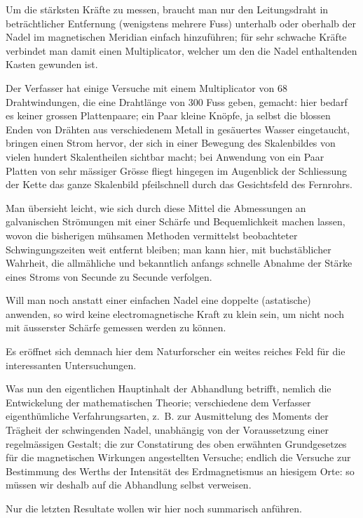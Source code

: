 \documentclass[12pt,a4paper]{article}
\begin{document}
Um die stärksten Kräfte zu messen, braucht man nur den Leitungsdraht in beträchtlicher Entfernung (wenigstens mehrere Fuss) unterhalb oder oberhalb der Nadel im magnetischen Meridian einfach hinzuführen; für sehr schwache Kräfte verbindet man damit einen Multiplicator, welcher um den die Nadel enthaltenden Kasten gewunden ist.

Der Verfasser hat einige Versuche mit einem Multiplicator von 68 Drahtwindungen, die eine Drahtlänge von 300 Fuss geben, gemacht: hier bedarf es keiner grossen Plattenpaare; ein Paar kleine Knöpfe, ja selbst die blossen Enden von Drähten aus verschiedenem Metall in gesäuertes Wasser eingetaucht, bringen einen Strom hervor, der sich in einer Bewegung des Skalenbildes von vielen hundert Skalentheilen sichtbar macht; bei Anwendung von ein Paar Platten von sehr mässiger Grösse fliegt hingegen im Augenblick der Schliessung der Kette das ganze Skalenbild pfeilschnell durch das Gesichtsfeld des Fernrohrs.

Man übersieht leicht, wie sich durch diese Mittel die Abmessungen an galvanischen Strömungen mit einer Schärfe und Bequemlichkeit machen lassen, wovon die bisherigen mühsamen Methoden vermittelst beobachteter Schwingungszeiten weit entfernt bleiben; man kann hier, mit buchstäblicher Wahrheit, die allmähliche und bekanntlich anfangs schnelle Abnahme der Stärke eines Stroms von Secunde zu Secunde verfolgen.

Will man noch anstatt einer einfachen Nadel eine doppelte (astatische) anwenden, so wird keine electromagnetische Kraft zu klein sein, um nicht noch mit äusserster Schärfe gemessen werden zu können.

Es eröffnet sich demnach hier dem Naturforscher ein weites reiches Feld für die interessanten Untersuchungen.

\bigskip

Was nun den eigentlichen Hauptinhalt der Abhandlung betrifft, nemlich die Entwickelung der mathematischen Theorie; verschiedene dem Verfasser eigenthümliche Verfahrungsarten, z.~B. zur Ausmittelung des Moments der Trägheit der schwingenden Nadel, unabhängig von der Voraussetzung einer regelmässigen Gestalt; die zur Constatirung des oben erwähnten Grundgesetzes für die magnetischen Wirkungen angestellten Versuche; endlich die Versuche zur Bestimmung des Werths der Intensität des Erdmagnetismus an hiesigem Orte: so müssen wir deshalb auf die Abhandlung selbst verweisen.

Nur die letzten Resultate wollen wir hier noch summarisch anführen.
\end{document}

